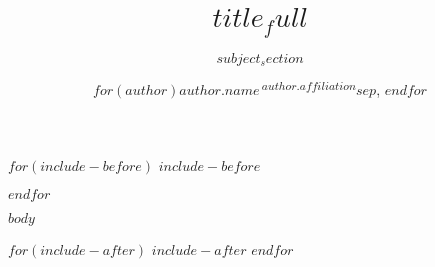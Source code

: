 \documentclass{bioinfo}
\begin{document}
$for(include-before)$
$include-before$

$endfor$


\subtitle{$subject_section$}

\title[$title_short$]{$title_full$}

\author[FirstAuthorLastName \textit{et~al}.]{
$for(author)$$author.name$\,\textsuperscript{$author.affiliation$}$sep$, $endfor$
}

\address{
$for(address)$
\textsuperscript{$address.code$}$address.address$\\
$endfor$
}





\maketitle

$body$

$for(include-after)$
$include-after$
$endfor$



\end{document}
